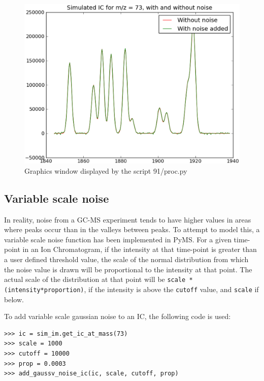\begin{figure}[h]
  \begin{center}
    \includegraphics[scale=0.25]{graphics/chapter09/test-91.eps}
  \end{center}
  \caption{Graphics window displayed by the script 91/proc.py}
  \label{fig:gaussc-noise-ic}
\end{figure}


\subsection{Variable scale noise}
\label{subsec:gaussv-noise-ic}


In reality, noise from a GC-MS experiment tends to have higher values in areas where peaks occur than in
the valleys between peaks. To attempt to model this, a variable scale noise function has been implemented in
PyMS. For a given time-point in an Ion Chromatogram, if the intensity at that time-point is greater than
a user defined threshold value, the scale of the normal distribution from which the noise value is drawn will be 
proportional to the intensity at that point. The actual scale of the distribution at that point will be
{\tt scale * (intensity*proportion)}, if the intensity is above the {\tt cutoff} value, and {\tt scale} if below.

To add variable scale gaussian noise to an IC, the following code is used:

\begin{verbatim}
>>> ic = sim_im.get_ic_at_mass(73)
>>> scale = 1000
>>> cutoff = 10000
>>> prop = 0.0003
>>> add_gaussv_noise_ic(ic, scale, cutoff, prop)
\end{verbatim}

